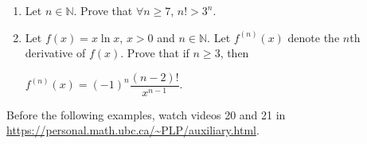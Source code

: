 \documentclass[12pt]{article}
\begin{document}
\begin{enumerate}
%
%
%
%
%
%
%

\item Let $n\in\mathbb{N}$. Prove that $\forall n\geq 7$, $n!>3^n$.


\item Let $f(x) = x \ln x$, $x > 0$ and $n\in\mathbb N$. Let $f^{(n)}(x)$ denote the $n$th derivative of $f(x)$.
Prove that if $n\geq 3$, then 

$f^{(n)}(x) = (-1)^n \dfrac{(n - 2)!}{x^{n-1}}$.

%
%
%
%
%
%

\end{enumerate}

Before the following examples, watch videos 20 and 21 in \url{https://personal.math.ubc.ca/~PLP/auxiliary.html}.
\end{document}
